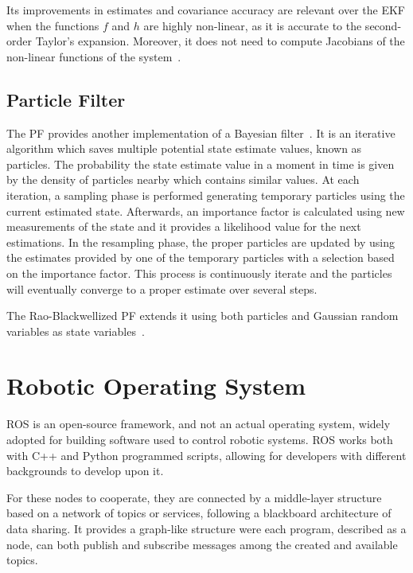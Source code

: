 Its improvements in estimates and covariance accuracy are relevant over the \gls{EKF} when the functions $f$ and $h$ are highly non-linear, as it is accurate to the second-order Taylor's expansion.
Moreover, it does not need to compute Jacobians of the non-linear functions of the system~\cite{thrun_probabilistic_2005}.



\section{Particle Filter}
\label{sec:pf}
\noindent The \gls{PF} provides another implementation of a Bayesian filter~\cite{particle}.
It is an iterative algorithm which saves multiple potential state estimate values, known as particles.
The probability the state estimate value in a moment in time is given by the density of particles nearby which contains similar values.
At each iteration, a sampling phase is performed generating temporary particles using the current estimated state.
Afterwards, an importance factor is calculated using new measurements of the state and it provides a likelihood value for the next estimations.
In the resampling phase, the proper particles are updated by using the estimates provided by one of the temporary particles with a selection based on the importance factor.
This process is continuously iterate and the particles will eventually converge to a proper estimate over several steps.

The Rao-Blackwellized \gls{PF} extends it using both particles and Gaussian random variables as state variables~\cite{murphy_rao-blackwellised_2001}.




\chapter{Robotic Operating System}
\label{ch:ros}
\noindent \Gls{ROS}\cite{288} is an open-source framework, and not an actual operating system, widely adopted for building software used to control robotic systems.
\Gls{ROS} works both with C++ and Python programmed scripts, allowing for developers with different backgrounds to develop upon it.


For these nodes to cooperate, they are connected by a middle-layer structure based on a network of topics or services, following a blackboard architecture of data sharing.
It provides a graph-like structure were each program, described as a
node, can both publish and subscribe messages among the created and available topics.

